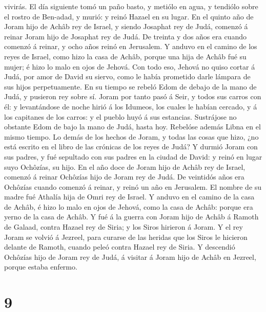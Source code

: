 vivirás.  El día siguiente tomó un paño basto, y metiólo en
agua, y tendiólo sobre el rostro de Ben-adad, y murió: y reinó Hazael en
su lugar.  En el quinto año de Joram hijo de Achâb rey de
Israel, y siendo Josaphat rey de Judá, comenzó á reinar Joram hijo de
Josaphat rey de Judá.  De treinta y dos años era cuando
comenzó á reinar, y ocho años reinó en Jerusalem.  Y anduvo
en el camino de los reyes de Israel, como hizo la casa de Achâb, porque
una hija de Achâb fué su mujer; é hizo lo malo en ojos de Jehová.
 Con todo eso, Jehová no quiso cortar á Judá, por amor de
David su siervo, como le había prometido darle lámpara de sus hijos
perpetuamente.  En su tiempo se rebeló Edom de debajo de la
mano de Judá, y pusieron rey sobre sí.  Joram por tanto
pasó á Seir, y todos sus carros con él: y levantándose de noche hirió á
los Idumeos, los cuales le habían cercado, y á los capitanes de los
carros: y el pueblo huyó á sus estancias.  Sustrájose no
obstante Edom de bajo la mano de Judá, hasta hoy. Rebelóse además Libna
en el mismo tiempo.  Lo demás de los hechos de Joram, y
todas las cosas que hizo, ¿no está escrito en el libro de las crónicas
de los reyes de Judá?  Y durmió Joram con sus padres, y fué
sepultado con sus padres en la ciudad de David: y reinó en lugar suyo
Ochôzías, su hijo.  En el año doce de Joram hijo de Achâb
rey de Israel, comenzó á reinar Ochôzías hijo de Joram rey de Judá.
 De veintidós años era Ochôzías cuando comenzó á reinar, y
reinó un año en Jerusalem. El nombre de su madre fué Athalía hija de
Omri rey de Israel.  Y anduvo en el camino de la casa de
Achâb, é hizo lo malo en ojos de Jehová, como la casa de Achâb: porque
era yerno de la casa de Achâb.  Y fué á la guerra con Joram
hijo de Achâb á Ramoth de Galaad, contra Hazael rey de Siria; y los
Siros hirieron á Joram.  Y el rey Joram se volvió á
Jezreel, para curarse de las heridas que los Siros le hicieron delante
de Ramoth, cuando peleó contra Hazael rey de Siria. Y descendió Ochôzías
hijo de Joram rey de Judá, á visitar á Joram hijo de Achâb en Jezreel,
porque estaba enfermo.

\hypertarget{section-8}{%
\section{9}\label{section-8}}

